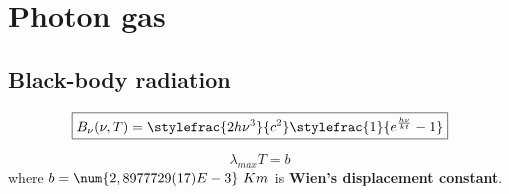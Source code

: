 \chapter{Photon gas}
\section{Black-body radiation}
	\begin{formula}
		\begin{equation}
			\label{photon:plancks_law_frequency}
            \boxed{B_\nu(\nu, T) = \stylefrac{2h\nu^3}{c^2}\stylefrac{1}{e^{\frac{h\nu}{kt}} - 1}}
		\end{equation}
	\end{formula}
    
    \begin{theorem}
		\begin{equation}
			\label{photon:wiens_displacement_law}
            \boxed{\lambda_{max}T = b}
		\end{equation}
        where $b = \num{2,8977729(17)E-3}\ Km$ is \textbf{Wien's displacement constant}.
	\end{theorem}